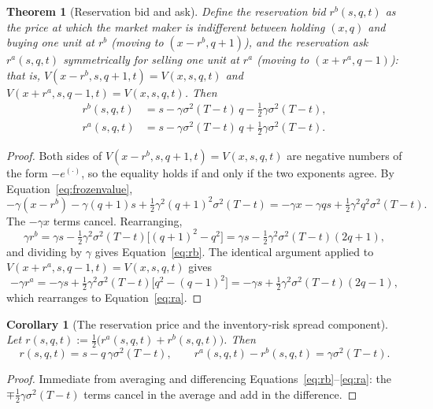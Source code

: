 \documentclass[11pt]{article}
\newtheorem{theorem}{Theorem}
\newtheorem{corollary}{Corollary}
\theoremstyle{remark}
\theoremstyle{definition}
\begin{document}
\begin{theorem}[Reservation bid and ask]
\label{thm:reservation}
Define the reservation bid $r^b(s,q,t)$ as the price at which the market maker is indifferent between holding $(x,q)$ and buying one unit at $r^b$ (moving to $(x-r^b,q+1)$), and the reservation ask $r^a(s,q,t)$ symmetrically for selling one unit at $r^a$ (moving to $(x+r^a,q-1)$): that is, $V(x-r^b,s,q+1,t)=V(x,s,q,t)$ and $V(x+r^a,s,q-1,t)=V(x,s,q,t)$. Then
\begin{align}
r^b(s,q,t) &= s - \gamma\sigma^2(T-t)\,q - \tfrac12\gamma\sigma^2(T-t), \label{eq:rb} \\
r^a(s,q,t) &= s - \gamma\sigma^2(T-t)\,q + \tfrac12\gamma\sigma^2(T-t). \label{eq:ra}
\end{align}
\end{theorem}
\begin{proof}
Both sides of $V(x-r^b,s,q+1,t)=V(x,s,q,t)$ are negative numbers of the form $-e^{(\cdot)}$, so the equality holds if and only if the two exponents agree. By Equation~\eqref{eq:frozenvalue},
\begin{equation*}
-\gamma(x-r^b) - \gamma(q+1)s + \tfrac12\gamma^2(q+1)^2\sigma^2(T-t) = -\gamma x - \gamma qs + \tfrac12\gamma^2q^2\sigma^2(T-t).
\end{equation*}
The $-\gamma x$ terms cancel. Rearranging,
\begin{equation*}
\gamma r^b = \gamma s - \tfrac12\gamma^2\sigma^2(T-t)\big[(q+1)^2-q^2\big]
 = \gamma s - \tfrac12\gamma^2\sigma^2(T-t)(2q+1),
\end{equation*}
and dividing by $\gamma$ gives Equation~\eqref{eq:rb}. The identical argument applied to $V(x+r^a,s,q-1,t)=V(x,s,q,t)$ gives
\begin{equation*}
-\gamma r^a = -\gamma s + \tfrac12\gamma^2\sigma^2(T-t)\big[q^2-(q-1)^2\big]
 = -\gamma s+\tfrac12\gamma^2\sigma^2(T-t)(2q-1),
\end{equation*}
which rearranges to Equation~\eqref{eq:ra}.
\end{proof}

\begin{corollary}[The reservation price and the inventory-risk spread component]
\label{cor:reservation}
Let $r(s,q,t) := \tfrac12\big(r^a(s,q,t)+r^b(s,q,t)\big)$. Then
\begin{equation}
r(s,q,t) = s - q\,\gamma\sigma^2(T-t), \qquad r^a(s,q,t) - r^b(s,q,t) = \gamma\sigma^2(T-t).
\label{eq:reservation}
\end{equation}
\end{corollary}
\begin{proof}
Immediate from averaging and differencing Equations~\eqref{eq:rb}--\eqref{eq:ra}: the $\mp\tfrac12\gamma\sigma^2(T-t)$ terms cancel in the average and add in the difference.
\end{proof}
\end{document}
